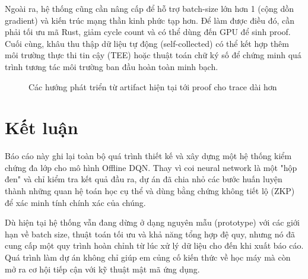 \documentclass[12pt,a4paper,oneside]{report}
\begin{document}
Ngoài ra, hệ thống cũng cần nâng cấp để hỗ trợ batch-size lớn hơn 1 (cộng dồn gradient) và kiến trúc mạng thần kinh phức tạp hơn. Để làm được điều đó, cần phải tối ưu mã Rust, giảm cycle count và có thể dùng đến GPU để sinh proof. Cuối cùng, khâu thu thập dữ liệu tự động (self-collected) có thể kết hợp thêm môi trường thực thi tin cậy (TEE) hoặc thuật toán chữ ký số để chứng minh quá trình tương tác môi trường ban đầu hoàn toàn minh bạch.

\begin{figure}[H]
\centering
{}
\caption{Các hướng phát triển từ artifact hiện tại tới proof cho trace dài hơn}
\end{figure}

\section{Kết luận}

Báo cáo này ghi lại toàn bộ quá trình thiết kế và xây dựng một hệ thống kiểm chứng đa lớp cho mô hình Offline DQN. Thay vì coi neural network là một "hộp đen" và chỉ kiểm tra kết quả đầu ra, dự án đã chia nhỏ các bước huấn luyện thành những quan hệ toán học cụ thể và dùng bằng chứng không tiết lộ (ZKP) để xác minh tính chính xác của chúng.

Dù hiện tại hệ thống vẫn đang dừng ở dạng nguyên mẫu (prototype) với các giới hạn về batch size, thuật toán tối ưu và khả năng tổng hợp đệ quy, nhưng nó đã cung cấp một quy trình hoàn chỉnh từ lúc xử lý dữ liệu cho đến khi xuất báo cáo. Quá trình làm dự án không chỉ giúp em củng cố kiến thức về học máy mà còn mở ra cơ hội tiếp cận với kỹ thuật mật mã ứng dụng.
\end{document}
